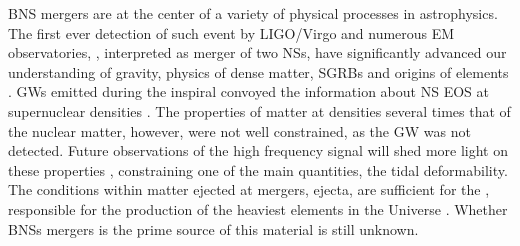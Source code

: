 %
%


\ac{BNS} mergers are at the center of a variety of physical processes in astrophysics.
The first ever detection of such event by \ac{LIGO}/Virgo and 
numerous \ac{EM} observatories, \GW{}, interpreted as merger of two 
\acp{NS}, have significantly advanced our understanding 
of gravity, physics of dense matter, \acp{SGRB} and origins of \rproc{} elements 
\citep{TheLIGOScientific:2017qsa,Abbott:2018wiz,GBM:2017lvd}. 
%
\acp{GW} emitted during the inspiral convoyed the information about  
\ac{NS} \ac{EOS} at supernuclear densities 
\citep{Hinderer:2009ca,Damour:2012yf,DelPozzo:2013ala}. 
The properties of matter at densities several times that of the 
nuclear matter, however, were not well constrained, as the \pmerg{} \ac{GW} 
was not detected. Future observations of the high frequency \pmerg{} signal 
will shed more light on these properties 
\citep{Sekiguchi:2011mc,Radice:2017lry,Most:2018eaw,Bauswein:2018bma}, 
constraining one of the main quantities, the tidal deformability.
%
The conditions within matter ejected at mergers, ejecta, are sufficient for the \rproc{} 
\nuc{}, responsible for the production of the heaviest elements in the Universe
\citep{Cowan:2019pkx}.
Whether \acp{BNS} mergers is the prime source of this material is still unknown.

